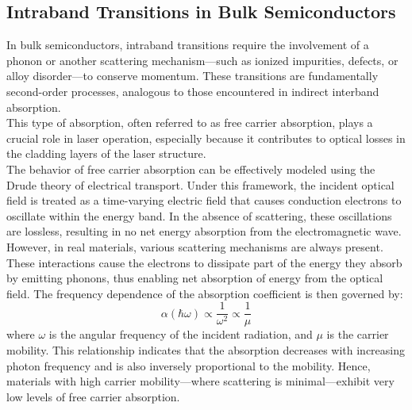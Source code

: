 \subsection{Intraband Transitions in Bulk Semiconductors}
In bulk semiconductors, intraband transitions require the involvement of a phonon or another scattering mechanism—such as ionized impurities, defects, or alloy disorder—to conserve momentum. These transitions are fundamentally second-order processes, analogous to those encountered in indirect interband absorption.\\
This type of absorption, often referred to as free carrier absorption, plays a crucial role in laser operation, especially because it contributes to optical losses in the cladding layers of the laser structure.\\
The behavior of free carrier absorption can be effectively modeled using the Drude theory of electrical transport. Under this framework, the incident optical field is treated as a time-varying electric field that causes conduction electrons to oscillate within the energy band. In the absence of scattering, these oscillations are lossless, resulting in no net energy absorption from the electromagnetic wave.\\
However, in real materials, various scattering mechanisms are always present. These interactions cause the electrons to dissipate part of the energy they absorb by emitting phonons, thus enabling net absorption of energy from the optical field. The frequency dependence of the absorption coefficient is then governed by:
\begin{equation}
	\alpha(\hbar \omega) \propto \frac{1}{\omega^2} \propto \frac{1}{\mu}
\end{equation}
where \( \omega \) is the angular frequency of the incident radiation, and \( \mu \) is the carrier mobility. This relationship indicates that the absorption decreases with increasing photon frequency and is also inversely proportional to the mobility. Hence, materials with high carrier mobility—where scattering is minimal—exhibit very low levels of free carrier absorption.


